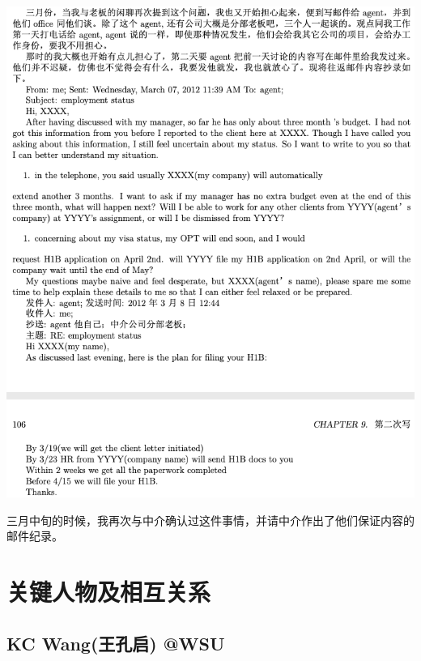 \documentclass[9pt, b5paper]{article}
\begin{document}
\begin{center}
\includegraphics[width=.9\linewidth]{./pic/p1p105.png}
\end{center}

三月中旬的时候，我再次与中介确认过这件事情，并请中介作出了他们保证内容的邮件纪录。 


\section{关键人物及相互关系}
\label{sec:org89101aa}
\subsection{KC Wang(王孔启) @WSU}
\label{sec:orgb77141e}
\end{document}
